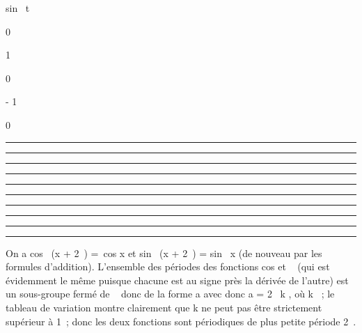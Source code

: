 \documentclass[]{article}
\begin{document}
sin~ t

0

\nearrow

1

\searrow

0

\searrow

- 1

\nearrow

0

\begin{center}\rule{3in}{0.4pt}\end{center}

\begin{center}\rule{3in}{0.4pt}\end{center}

\begin{center}\rule{3in}{0.4pt}\end{center}

\begin{center}\rule{3in}{0.4pt}\end{center}

\begin{center}\rule{3in}{0.4pt}\end{center}

\begin{center}\rule{3in}{0.4pt}\end{center}

\begin{center}\rule{3in}{0.4pt}\end{center}

\begin{center}\rule{3in}{0.4pt}\end{center}

\begin{center}\rule{3in}{0.4pt}\end{center}

\begin{center}\rule{3in}{0.4pt}\end{center}

On a cos~ (x + 2\pi~) =\
cos x et sin~ (x + 2\pi~)
= sin~ x (de nouveau par les formules
d'addition). L'ensemble des périodes des fonctions
cos et \sin~ (qui est
évidemment le même puisque chacune est au signe près la dérivée de
l'autre) est un sous-groupe fermé de \mathbb{R}~ donc de la forme a avec donc a
= 2\pi~ \over k , où k \in \mathbb{Z}~; le tableau de variation
montre clairement que k ne peut pas être strictement supérieur à 1~;
donc les deux fonctions sont périodiques de plus petite période 2\pi~.
\end{document}
